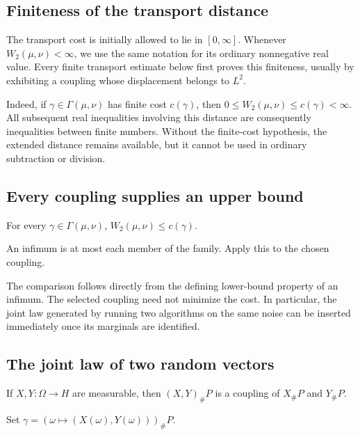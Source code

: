 \documentclass[11pt,a4paper]{article}
\begin{document}
\subsection{\texorpdfstring{Finiteness of the transport distance}{Finiteness of the transport distance}}


The transport cost is initially allowed to lie in \([0,\infty]\). Whenever \(W_2(\mu,\nu)<\infty\), we use the same notation for its ordinary nonnegative real value. Every finite transport estimate below first proves this finiteness, usually by exhibiting a coupling whose displacement belongs to \(L^2\).



Indeed, if \(\gamma\in\Gamma(\mu,\nu)\) has finite cost \(c(\gamma)\), then \(0\le W_2(\mu,\nu)\le c(\gamma)<\infty\). All subsequent real inequalities involving this distance are consequently inequalities between finite numbers. Without the finite-cost hypothesis, the extended distance remains available, but it cannot be used in ordinary subtraction or division.


\subsection{\texorpdfstring{Every coupling supplies an upper bound}{Every coupling supplies an upper bound}}


For every \(\gamma\in\Gamma(\mu,\nu)\), \(W_2(\mu,\nu)\le c(\gamma)\).



An infimum is at most each member of the family. Apply this to the chosen coupling.



The comparison follows directly from the defining lower-bound property of an infimum. The selected coupling need not minimize the cost. In particular, the joint law generated by running two algorithms on the same noise can be inserted immediately once its marginals are identified.


\subsection{\texorpdfstring{The joint law of two random vectors}{The joint law of two random vectors}}


If \(X,Y:\Omega\to H\) are measurable, then \((X,Y)_\#P\) is a coupling of \(X_\#P\) and \(Y_\#P\).



Set \(\gamma=(\omega\mapsto(X(\omega),Y(\omega)))_\#P\).
\end{document}
